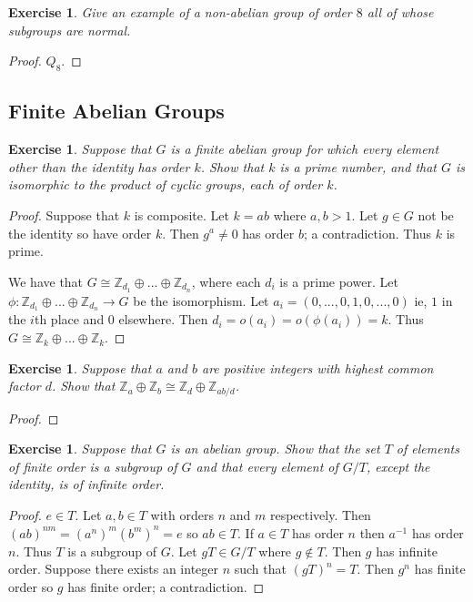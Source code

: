 \documentclass{article}
\newtheorem{exercise}[theorem]{Exercise}
\begin{document}
\begin{exercise}
Give an example of a non-abelian group of order $8$ all of whose subgroups are normal.
\end{exercise}
\begin{proof}
$Q_8$.
\end{proof}

\subsection{Finite Abelian Groups}

\begin{exercise}
Suppose that $G$ is a finite abelian group for which every element other than the identity has order $k$. Show that $k$ is a prime number, and that $G$ is isomorphic to the product of cyclic groups, each of order $k$.
\end{exercise}
\begin{proof}
Suppose that $k$ is composite. Let $k=ab$ where $a,b>1$. Let $g\in G$ not be the identity so have order $k$. Then $g^a\neq 0$ has order $b$; a contradiction. Thus $k$ is prime.

We have that $G\cong \mathbb{Z}_{d_1}\oplus...\oplus \mathbb{Z}_{d_n}$, where each $d_i$ is a prime power. Let $\phi:\mathbb{Z}_{d_1}\oplus...\oplus \mathbb{Z}_{d_n}\to G$ be the isomorphism. Let $a_i=(0,...,0,1,0,...,0)$ ie, $1$ in the $i$th place and $0$ elsewhere. Then $d_i=o(a_i)=o(\phi(a_i))=k$. Thus $G\cong \mathbb{Z}_k\oplus...\oplus \mathbb{Z}_k$.
\end{proof}

\begin{exercise}
Suppose that $a$ and $b$ are positive integers with highest common factor $d$. Show that $\mathbb{Z}_a\oplus \mathbb{Z}_b\cong\mathbb{Z}_d\oplus\mathbb{Z}_{ab/d}$.
\end{exercise}
\begin{proof}
\end{proof}

\begin{exercise}
Suppose that $G$ is an abelian group. Show that the set $T$ of elements of finite order is a subgroup of $G$ and that every element of $G/T$, except the identity, is of infinite order.
\end{exercise}
\begin{proof}
$e\in T$. Let $a,b\in T$ with orders $n$ and $m$ respectively. Then $(ab)^{nm}=(a^n)^m(b^m)^n=e$ so $ab\in T$. If $a\in T$ has order $n$ then $a^{-1}$ has order $n$. Thus $T$ is a subgroup of $G$. Let $gT\in G/T$ where $g\notin T$. Then $g$ has infinite order. Suppose there exists an integer $n$ such that $(gT)^n=T$. Then $g^n$ has finite order so $g$ has finite order; a contradiction.
\end{proof}
\end{document}
